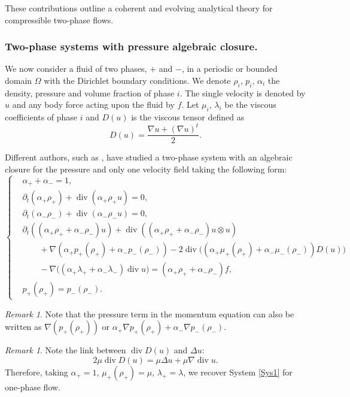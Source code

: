 \documentclass[11pt, twoside, a4paper]{article}
\theoremstyle{plain}
\theoremstyle{remark}
\newtheorem{remark}[theorem]{Remark}
\numberwithin{equation}{section}
\renewcommand{\div}{\operatorname{div}}
\newcommand{\dt}{\partial_t}
\newcommand{\ap}{\alpha_+}
\newcommand{\am}{\alpha_-}
\newcommand{\rp}{\rho_+}
\newcommand{\rmi}{\rho_-}
\begin{document}
These contributions outline a coherent and evolving analytical theory for compressible two-phase flows.


\subsubsection{Two-phase systems with pressure algebraic closure.}

We now consider a fluid of two phases, $+$ and $-$, in a periodic or bounded domain $\Omega$ with the Dirichlet boundary conditions. We denote $\rho_i$, $p_i$, $\alpha_i$ the density, pressure and volume fraction of phase $i$. The single velocity is denoted by $u$ and any body force acting upon the fluid by $f$. Let $\mu_i$, $\lambda_i$ be the viscous coefficients of phase $i$ and $D(u)$ is the viscous tensor defined as
\[ D(u) = \frac{\nabla u + (\nabla u)^t}{2}.
\]

Different authors, such as \cite{novotny2020weak}, have studied a two-phase system with an algebraic closure for the pressure and only one velocity field taking the following form:
\begin{equation}
\left\{
    \begin{aligned}\label{algebraic1velocity}
        &\ap + \am = 1,\\
        &\dt (\ap \rp) + \div(\ap \rp u) = 0,\\
        &\dt (\am \rmi) + \div(\am \rmi u) = 0,\\
        &\dt ((\ap \rp + \am \rmi) u) + \div ((\ap \rp + \am \rmi) u \otimes u)\\
        &\quad \quad + \nabla (\ap p_+(\rp) + \am p_-(\rmi)) - 2 \div \Big( (\ap \mu_+(\rp) + \am \mu_-(\rmi)) D(u) \Big)\\
        &\quad \quad - \nabla \Big( (\ap \lambda_+ + \am \lambda_-) \div u \Big) = (\ap \rp + \am \rmi) f,\\
        &p_+(\rp) = p_-(\rmi).
    \end{aligned}
    \right.
\end{equation}


\begin{remark}
Note that the pressure term in the momentum equation can also be written as $\nabla (p_+(\rp))$ or $\ap \nabla p_+(\rp) + \am \nabla p_-(\rmi)$.
\end{remark} 

\begin{remark}
Note the link between $\div D(u)$ and $\Delta u$:
$$2 \mu \div D(u) = \mu \Delta u + \mu \nabla \div u. $$
Therefore, taking $\ap=1$, $\mu_+(\rp)=\mu$, $\lambda_+=\lambda$, we recover System \eqref{Sys1} for one-phase flow.\newline 
\end{remark}
\end{document}
